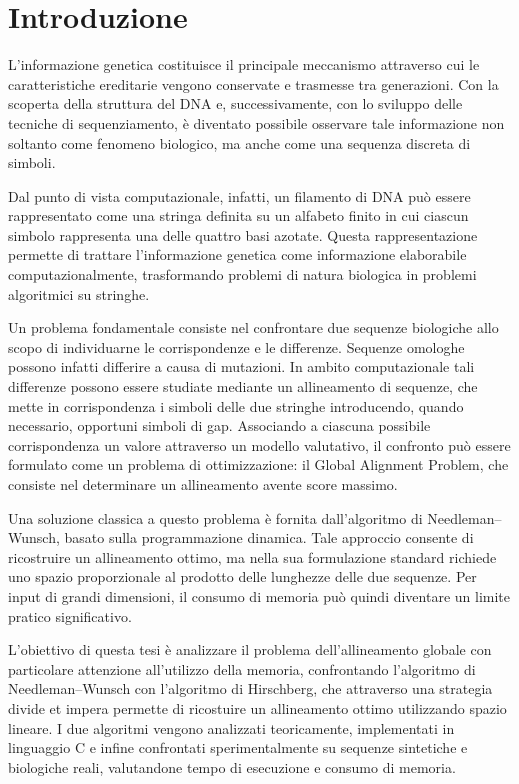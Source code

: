 \section{Introduzione}

L'informazione genetica costituisce il principale meccanismo attraverso cui le caratteristiche ereditarie vengono conservate e trasmesse
tra generazioni. Con la scoperta della struttura del DNA e, successivamente, con lo sviluppo delle tecniche di sequenziamento, è diventato
possibile osservare tale informazione non soltanto come fenomeno biologico, ma anche come una sequenza discreta di simboli.

Dal punto di vista computazionale, infatti, un filamento di DNA può essere rappresentato come una stringa definita su un alfabeto finito
in cui ciascun simbolo rappresenta una delle quattro basi azotate. Questa rappresentazione permette di trattare l'informazione genetica
come informazione elaborabile computazionalmente, trasformando problemi di natura biologica in problemi algoritmici su stringhe.

Un problema fondamentale consiste nel confrontare due sequenze biologiche allo scopo di individuarne le corrispondenze e le differenze.
Sequenze omologhe possono infatti differire a causa di mutazioni. In ambito computazionale tali differenze possono
essere studiate mediante un allineamento di sequenze, che mette in corrispondenza i simboli delle due stringhe introducendo, quando necessario,
opportuni simboli di gap. Associando a ciascuna possibile corrispondenza un valore attraverso un modello valutativo, il confronto può essere formulato
come un problema di ottimizzazione: il Global Alignment Problem, che consiste nel determinare un allineamento avente score massimo.

Una soluzione classica a questo problema è fornita dall'algoritmo di Needleman--Wunsch, basato sulla programmazione dinamica.
Tale approccio consente di ricostruire un allineamento ottimo, ma nella sua formulazione standard richiede uno spazio proporzionale al prodotto
delle lunghezze delle due sequenze.
Per input di grandi dimensioni, il consumo di memoria può quindi diventare un limite pratico significativo.

L'obiettivo di questa tesi è analizzare il problema dell'allineamento globale con particolare attenzione all'utilizzo della memoria, confrontando
l'algoritmo di Needleman--Wunsch con l'algoritmo di Hirschberg, che attraverso una strategia divide et impera permette di ricostuire un allineamento
ottimo utilizzando spazio lineare. I due algoritmi vengono analizzati teoricamente, implementati in linguaggio C e infine confrontati sperimentalmente
su sequenze sintetiche e biologiche reali, valutandone tempo di esecuzione e consumo di memoria.
